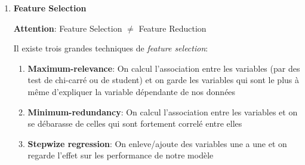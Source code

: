 \documentclass[a4paper, 11pt, onecolumn]{article}
\begin{document}
\begin{enumerate}
\item \textbf{Feature Selection}

\textbf{Attention}: Feature Selection $\neq$ Feature Reduction

Il existe trois grandes techniques de \textit{feature selection}:
\begin{enumerate}
\item \textbf{Maximum-relevance}: On calcul l'association entre les variables (par des test de chi-carré ou de student) et on garde les variables qui sont le plus à même d'expliquer la variable dépendante de nos données
\item \textbf{Minimum-redundancy}: On calcul l'association entre les variables et on se débarasse de celles qui sont fortement correlé entre elles
\item \textbf{Stepwize regression}: On enleve/ajoute des variables une a une et on regarde l'effet sur les performance de notre modèle
\end{enumerate}

\end{enumerate}
\end{document}
